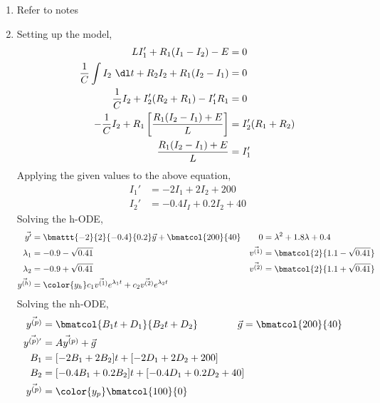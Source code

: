 \begin{enumerate}
    \item Refer to notes

    \item Setting up the model,
          \begin{align}
              LI_1' + R_1 (I_1 - I_2) - E                             & = 0    \\
              \frac{1}{C} \int I_2\ \dl t + R_2 I_2 + R_1 (I_2 - I_1) & = 0    \\
              \frac{1}{C}I_2 + I_2' (R_2 + R_1) - I_1' R_1            & = 0    \\
              -\frac{1}{C}I_2
              + R_1 \left[ \frac{R_1 (I_2 - I_1) + E}{L} \right]      &
              = I_2' (R_1 + R_2)                                               \\
              \frac{R_1 (I_2 - I_1) + E}{L}                           & = I_1'
          \end{align}
          Applying the given values to the above equation,
          \begin{align}
              I_1' & = -2I_1 + 2I_2 + 200     \\
              I_2' & = - 0.4I_I + 0.2I_2 + 40
          \end{align}
          Solving the h-ODE,
          \begin{align}
              \vec{y'}            & = \bmattt{-2}{2}{-0.4}{0.2} \vec{y}
              + \bmatcol{200}{40} &
              0                   & = \lambda^{2} + 1.8\lambda + 0.4      \\
              \lambda_1           & = -0.9 - \sqrt{0.41}                &
              \vec{v^{(1)}}       & = \bmatcol{2}{1.1 - \sqrt{0.41}}      \\
              \lambda_2           & = -0.9 + \sqrt{0.41}                &
              \vec{v^{(2)}}       & = \bmatcol{2}{1.1 + \sqrt{0.41}}      \\
              \vec{y^{(h)}}       & = \color{y_h}
              c_1 \vec{v^{(1)}}e^{\lambda_1 t}
              + c_2 \vec{v^{(2)}} e^{\lambda_2 t}
          \end{align}
          Solving the nh-ODE,
          \begin{align}
              \vec{y^{(p)}}          & = \bmatcol{B_1 t + D_1}
              {B_2 t + D_2} \qquad\qquad
              \vec{g} = \bmatcol{200}{40}                             \\
              \vec{y^{(p)'}}         & = \vec{Ay^{(p)}} + \vec{g}     \\
              B_1                    & =  [-2B_1 + 2B_2] t
              + [-2D_1 + 2D_2 + 200] &                                \\
              B_2                    & =  [-0.4B_1 + 0.2B_2] t
              + [-0.4D_1 + 0.2D_2 + 40]                               \\
              \vec{y^{(p)}}          & = \color{y_p} \bmatcol{100}{0}
          \end{align}


\end{enumerate}
